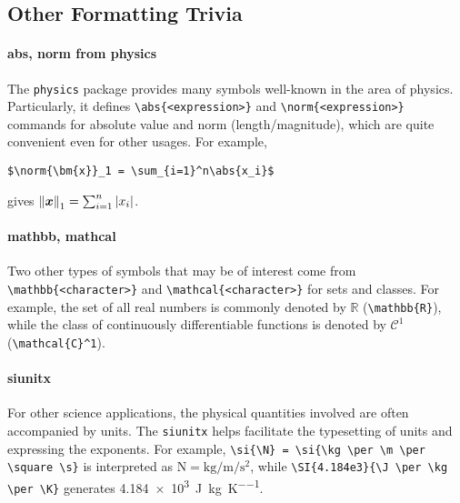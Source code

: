 \subsection{Other Formatting Trivia}

\paragraph{abs, norm from physics}
The \verb|physics| package provides many symbols well-known in the area of physics. Particularly, it defines \texttt{\textbackslash abs\{<expression>\}} and \texttt{\textbackslash norm\{<expression>\}} commands for absolute value and norm (length/magnitude), which are quite convenient even for other usages. For example, 
\begin{lstlisting}
$\norm{\bm{x}}_1 = \sum_{i=1}^n\abs{x_i}$
\end{lstlisting}
gives $\norm{\bm{x}}_1 = \sum_{i=1}^n\abs{x_i}$.

\paragraph{mathbb, mathcal}
Two other types of symbols that may be of interest come from \texttt{\textbackslash mathbb\{<character>\}} and \texttt{\textbackslash mathcal\{<character>\}} for sets and classes. For example, the set of all real numbers is commonly denoted by $\mathbb{R}$ (\texttt{\textbackslash mathbb\{R\}}), while the class of continuously differentiable functions is denoted by $\mathcal{C}^1$ (\texttt{\textbackslash mathcal\{C\}\^{}1}).

\paragraph{siunitx}
For other science applications, the physical quantities involved are often accompanied by units. The \verb|siunitx| helps facilitate the typesetting of units and expressing the exponents. For example, \texttt{\textbackslash si\{\textbackslash N\} = \textbackslash si\{\textbackslash kg \textbackslash per \textbackslash m \textbackslash per \textbackslash square \textbackslash s\}} is interpreted as $\si{\N} = \si{\kg \per \m \per \square \s}$, while \texttt{\textbackslash SI\{4.184e3\}\{\textbackslash J \textbackslash per \textbackslash kg \textbackslash per \textbackslash K\}} generates \SI{4.184e3}{\J \per \kg \per \K}.

